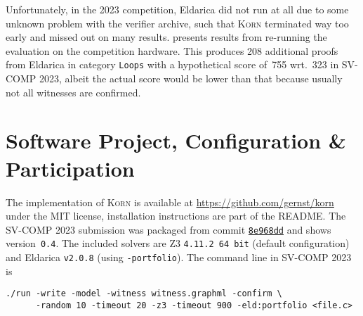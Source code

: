 \documentclass{llncs}
\newcommand{\Korn}{\textsc{Korn}\xspace}
\begin{document}
Unfortunately, in the 2023 competition,
Eldarica did not run at all due to some unknown problem with the verifier archive,
such that \Korn terminated way too early and missed out on many results.
 presents results from re-running the evaluation on the competition hardware.
This produces 208 additional proofs from Eldarica
in category \texttt{Loops} with a hypothetical score of~755 wrt.~323 in SV-COMP 2023,
albeit the actual score would be lower than that because usually not all witnesses are confirmed.



\section{Software Project, Configuration \& Participation}
\label{sec:project}

The implementation of \Korn is available at
    \url{https://github.com/gernst/korn} under the MIT license,
installation instructions are part of the README.
The SV-COMP 2023 submission was packaged from commit
\href{https://github.com/gernst/korn/commit/8e968dd9e1498d358270d1e78d473befca8e63a8}{\tt 8e968dd}
and shows version~\texttt{0.4}.
The included solvers are Z3 \texttt{4.11.2 64 bit} (default configuration) and Eldarica \texttt{v2.0.8} (using \texttt{-portfolio}).
The command line in SV-COMP 2023 is
\begin{verbatim}
./run -write -model -witness witness.graphml -confirm \
      -random 10 -timeout 20 -z3 -timeout 900 -eld:portfolio <file.c>
\end{verbatim}
\end{document}
